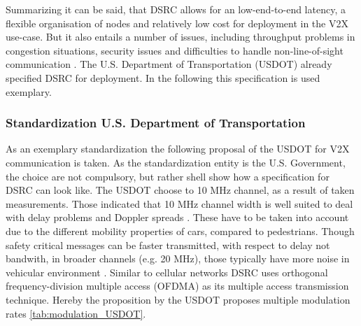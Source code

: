 \documentclass[conference,12pt,onecolumn]{IEEEtran}
\begin{document}
Summarizing it can be said, that DSRC allows for an low-end-to-end latency, a flexible organisation of nodes and relatively low cost for deployment in the V2X use-case. But it also entails a number of issues, including throughput problems in congestion situations, security issues and difficulties to handle non-line-of-sight communication \cite{machardy2018}. The U.S. Department of Transportation (USDOT) already specified DSRC for deployment. In the following this specification is used exemplary.

\subsubsection*{Standardization U.S. Department of Transportation}
As an exemplary standardization the following proposal of the USDOT for V2X communication is taken. As the standardization entity is the U.S. Government, the choice are not compulsory, but rather shell show how a specification for DSRC can look like.
The USDOT choose to 10 MHz channel, as a result of taken measurements. Those indicated that 10 MHz channel width is well suited to deal with delay problems and Doppler spreads \cite{kenney2011}. These have to be taken into account due to the different mobility properties of cars, compared to pedestrians.  Though safety critical messages can be faster transmitted, with respect to delay not bandwith, in broader channels (e.g. 20 MHz), those typically have more noise in vehicular environment \cite{kenney2011}.
Similar to cellular networks DSRC uses orthogonal frequency-division multiple access (OFDMA) as its multiple access transmission technique. Hereby the proposition by the USDOT proposes multiple modulation rates \ref{tab:modulation_USDOT}.
\end{document}
